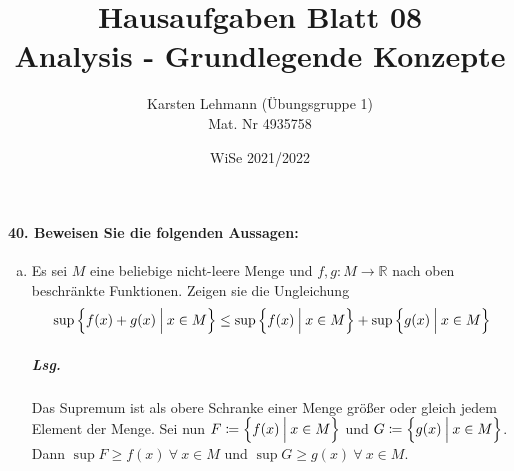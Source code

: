 \documentclass{scrreprt}
\author{Karsten Lehmann (Übungsgruppe 1)\\Mat. Nr 4935758}
\date{WiSe 2021/2022}
\title{Hausaufgaben Blatt 08\\Analysis - Grundlegende Konzepte}
\begin{document}
\paragraph{40. Beweisen Sie die folgenden Aussagen:}
\begin{enumerate}[(a)]
\item Es sei $M$ eine beliebige nicht-leere Menge und
  $f, g \colon M \to \mathbb{R}$ nach oben beschränkte Funktionen.
  Zeigen sie die Ungleichung
  \[
    \sup\qty{f(x) + g(x) \: {\Big |} \: x \in M}
    \leq
    \sup\qty{f(x) \: {\Big |} \: x \in M} +
    \sup\qty{g(x) \: {\Big |} \: x \in M}
  \]

  \subparagraph{Lsg.} Das Supremum ist als obere Schranke einer Menge größer
  oder gleich jedem Element der Menge.
  Sei nun $F \coloneqq \qty{f(x) \: {\Big |} \: x \in M}$ und
  $G \coloneqq \qty{g(x) \: {\Big |} \: x \in M}$.
  Dann $\sup F \geq f(x) \: \forall \: x \in M$ und
  $\sup G \geq g(x) \: \forall \: x \in M$.
\end{enumerate}
\end{document}
